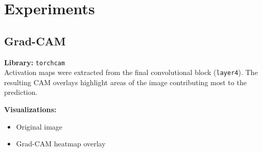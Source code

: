 \documentclass{article}
\begin{document}
\section{Experiments}

\subsection{Grad-CAM}
\textbf{Library:} \texttt{torchcam}~\cite{torchcam} \\
Activation maps were extracted from the final convolutional block (\texttt{layer4}). The resulting CAM overlays highlight areas of the image contributing most to the prediction.

\textbf{Visualizations:}
\begin{itemize}
    \item Original image
    \item Grad-CAM heatmap overlay
\end{itemize}
\end{document}
